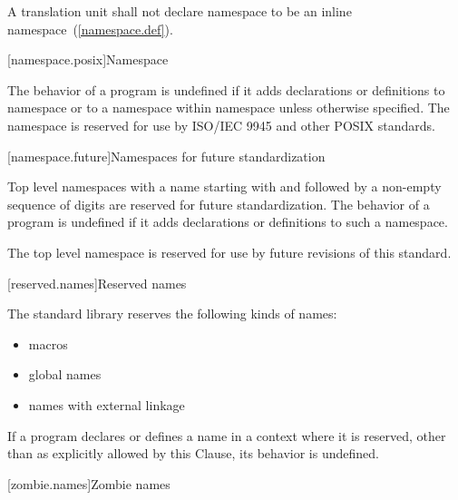\pnum
A translation unit shall not declare namespace  to be an inline namespace~(\ref{namespace.def}).

[namespace.posix]{Namespace }

\pnum
The behavior of a \Cpp program is undefined if it adds declarations or definitions to namespace
or to a namespace within namespace
unless otherwise specified. The namespace  is reserved for use by
ISO/IEC 9945 and other POSIX standards.

[namespace.future]{Namespaces for future standardization}

\pnum
Top level namespaces with a name starting with  and
followed by a non-empty sequence of digits
are reserved for future standardization.
The behavior of a \Cpp program is undefined if
it adds declarations or definitions to such a namespace.
\begin{example} The top level namespace  is reserved
for use by future revisions of this standard. \end{example}

[reserved.names]{Reserved names}%

\pnum
The \Cpp standard library reserves the following kinds of names:
\begin{itemize}
\item macros
\item global names
\item names with external linkage
\end{itemize}

\pnum
If a program declares or defines a name in a context where it is
reserved, other than as explicitly allowed by this Clause, its behavior is
undefined.%

[zombie.names]{Zombie names}%
%
%
%

